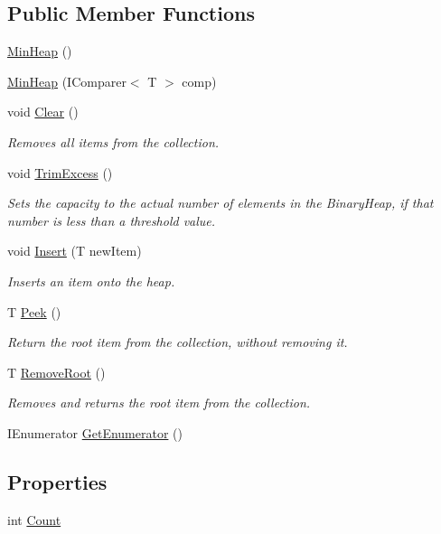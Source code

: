\subsection*{Public Member Functions}
\begin{DoxyCompactItemize}
\item 
\hyperlink{class_min_heap_ab12d943d2ccb65fcd4f22a803467ee75}{Min\+Heap} ()
\item 
\hyperlink{class_min_heap_a6cb34313b0c8c233f9a0cf84e1eaad69}{Min\+Heap} (I\+Comparer$<$ T $>$ comp)
\item 
void \hyperlink{class_min_heap_a3d6a33a214d775e6973f2e02f95cf993}{Clear} ()
\begin{DoxyCompactList}\small\item\em Removes all items from the collection. \end{DoxyCompactList}\item 
void \hyperlink{class_min_heap_a95d3f69823be576087b028d2e24300de}{Trim\+Excess} ()
\begin{DoxyCompactList}\small\item\em Sets the capacity to the actual number of elements in the Binary\+Heap, if that number is less than a threshold value. \end{DoxyCompactList}\item 
void \hyperlink{class_min_heap_a666a64f363294fca2bf96e0b92fcd755}{Insert} (T new\+Item)
\begin{DoxyCompactList}\small\item\em Inserts an item onto the heap. \end{DoxyCompactList}\item 
T \hyperlink{class_min_heap_a3c2b5871fae13d0765170d7f369b7ebe}{Peek} ()
\begin{DoxyCompactList}\small\item\em Return the root item from the collection, without removing it. \end{DoxyCompactList}\item 
T \hyperlink{class_min_heap_a67896572158c4db45e5d65739335639f}{Remove\+Root} ()
\begin{DoxyCompactList}\small\item\em Removes and returns the root item from the collection. \end{DoxyCompactList}\item 
I\+Enumerator \hyperlink{class_min_heap_a37ff412300c1e588a2aeac794ba9a5a4}{Get\+Enumerator} ()
\end{DoxyCompactItemize}
\subsection*{Properties}
\begin{DoxyCompactItemize}
\item 
int \hyperlink{class_min_heap_af0e0aa9be4131a317e7a54c86e5aebc9}{Count}
\end{DoxyCompactItemize}


